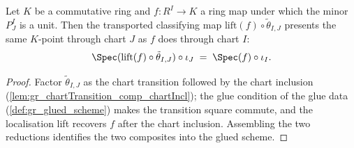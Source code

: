 \begin{lemma}
  \label{lem:gr_chart_point_eq}
  Let \(K\) be a commutative ring and \(f : R^I \to K\) a ring map under which the minor
  \(P^I_J\) is a unit. Then the transported classifying map
  \(\mathrm{lift}(f) \circ \tilde\theta_{I,J}\) presents the same \(K\)-point through chart
  \(J\) as \(f\) does through chart \(I\):
  \[
    \Spec(\mathrm{lift}(f) \circ \tilde\theta_{I,J}) \circ \iota_J
      \;=\; \Spec(f) \circ \iota_I.
  \]
\end{lemma}
\begin{proof}
  Factor \(\tilde\theta_{I,J}\) as the chart transition followed by the chart inclusion
  (\cref{lem:gr_chartTransition_comp_chartIncl}); the glue condition of the glue data
  (\cref{def:gr_glued_scheme}) makes the transition square commute, and the localisation
  lift recovers \(f\) after the chart inclusion. Assembling the two reductions identifies
  the two composites into the glued scheme.
\end{proof}

